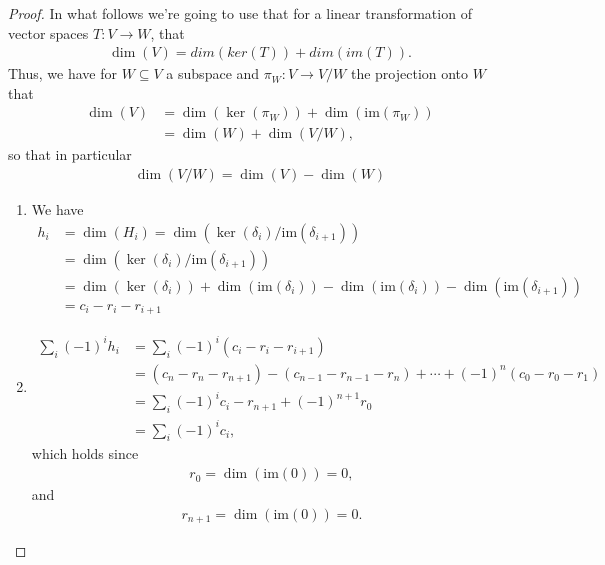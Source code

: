 \documentclass[12pt]{extarticle}
\newcommand{\im}{\text{im}}
\newcommand{\<}{\langle}
\renewcommand{\>}{\rangle}
\theoremstyle{definition}
\begin{document}
\begin{proof}
  In what follows we're going to use that for a linear transformation of vector spaces $T:V \to W$, that 
  \begin{align*}
    \dim(V) = dim(ker(T)) + dim(im(T)).
  \end{align*}
  Thus, we have for $W \subseteq V$ a subspace and $\pi_W : V \to V/W$ the projection onto $W$ that 
  \begin{align*}
    \dim(V)
    &= \dim(\ker(\pi_W)) + \dim(\im(\pi_W)) \\
    &= \dim(W) + \dim(V/W),
  \end{align*}
  so that in particular
  \begin{align*}
    \dim(V/W) = \dim(V) - \dim(W)
  \end{align*}
  
  \begin{enumerate}
  \item
    We have 
    \begin{align*}
      h_i
      &= \dim(H_i) = \dim (\ker(\delta_i)/\im(\delta_{i+1})) \\
      &= \dim (\ker(\delta_i)/\im(\delta_{i+1})) \\
      &= \dim (\ker(\delta_i)) + \dim(\im(\delta_i)) - \dim(\im(\delta_i)) - \dim(\im(\delta_{i+1}))  \\
      &=  c_i - r_i - r_{i+1}
    \end{align*}
  \item
    \begin{align*}
      \sum\limits_i (-1)^i h_i &= \sum\limits_i (-1)^i (c_i - r_i - r_{i+1})  \\
      &= (c_n - r_n - r_{n+1}) - (c_{n-1} - r_{n-1} - r_n) + \cdots + (-1)^n(c_0 - r_0 - r_1) \\
      &= \sum \limits_i (-1)^i c_i - r_{n+1} + (-1)^{n+1} r_0 \\
      &= \sum \limits_i (-1)^i c_i,
    \end{align*}
    which holds since
    \begin{align*}
      r_0 = \dim(\im(0)) = 0,
    \end{align*}
    and
    \begin{align*}
      r_{n+1} = \dim(\im(0)) = 0.
    \end{align*}
  \end{enumerate}
\end{proof}
\end{document}
